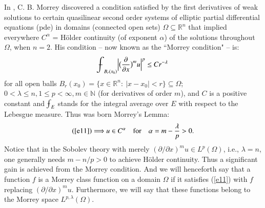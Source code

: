 \documentclass[12pt]{amsart}
\begin{document}
In \cite{M1938}, C. B. Morrey discovered a condition satisfied by the first derivatives of weak solutions to certain quasilinear second order systems of elliptic partial differential equations (pde) in domains (connected open sets) $\Omega\subseteq\mathbb R^n$ that implied everywhere $C^\alpha$ = H\"older continuity (of exponent $\alpha$) of the solutions throughout $\Omega$, when $n=2$. His condition -- now known as the ``Morrey condition" -- is:
\begin{equation}\label{e11}
{{\mathchoice
{{{\setbox0=\hbox{$\displaystyle{\textstyle{-}}{\int}$ }
\vcenter{\hbox{$\textstyle{-}$ }}\kern-.6\wd0}}}{{{\setbox0=\hbox{$\textstyle{\scriptstyle{-}}{\int}$ }
\vcenter{\hbox{$\scriptstyle{-}$ }}\kern-.6\wd0}}}{{{\setbox0=\hbox{$\scriptstyle{\scriptscriptstyle{-}}{\int}$ }
\vcenter{\hbox{$\scriptscriptstyle{-}$ }}\kern-.6\wd0}}}{{{\setbox0=\hbox{$\scriptscriptstyle{\scriptscriptstyle{-}}{\int}$ }
\vcenter{\hbox{$\scriptscriptstyle{-}$ }}\kern-.6\wd0}}}\!\int}}_{B_r(x_0)}\Big|\big(\frac{\partial}{\partial x}\big)^m u\Big|^p\le C r^{-\lambda}
\end{equation}
for all open balls $B_r(x_0)=\{x\in\mathbb R^n:\ |x-x_0|<r\}\subseteq\Omega$; $0<\lambda\le n, 1\le p<\infty, m\in\mathbb N$ (for derivatives of order $m$), and $C$ is a positive constant and ${{\mathchoice
{{{\setbox0=\hbox{$\displaystyle{\textstyle{-}}{\int}$ }
\vcenter{\hbox{$\textstyle{-}$ }}\kern-.6\wd0}}}{{{\setbox0=\hbox{$\textstyle{\scriptstyle{-}}{\int}$ }
\vcenter{\hbox{$\scriptstyle{-}$ }}\kern-.6\wd0}}}{{{\setbox0=\hbox{$\scriptstyle{\scriptscriptstyle{-}}{\int}$ }
\vcenter{\hbox{$\scriptscriptstyle{-}$ }}\kern-.6\wd0}}}{{{\setbox0=\hbox{$\scriptscriptstyle{\scriptscriptstyle{-}}{\int}$ }
\vcenter{\hbox{$\scriptscriptstyle{-}$ }}\kern-.6\wd0}}}\!\int}}_{E}$ stands for the integral average over $E$ with respect to the Lebesgue measure. Thus was born Morrey's Lemma:
$$
(\ref{e11})\Longrightarrow u\in C^\alpha\quad\hbox{for}\quad \alpha=m-\frac{\lambda}{p}>0.
$$
Notice that in the Sobolev theory with merely $(\partial/\partial x)^mu\in L^{p}(\Omega)$, i.e., $\lambda=n$, one generally needs $m-{n}/{p}>0$ to achieve H\"older continuity. Thus a significant gain is achieved from the Morrey condition. And we will henceforth say that a function $f$ is a Morrey class function on a domain $\Omega$ if it satisfies (\ref{e11}) with $f$ replacing $(\partial/\partial x)^mu$. Furthermore, we will say that these functions belong to the Morrey space $L^{p,\lambda}(\Omega)$.
\end{document}
